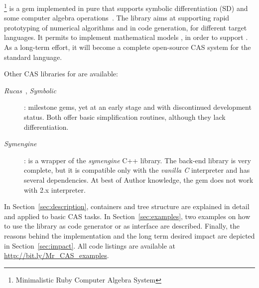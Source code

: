 \ragnicas\footnote{Minimalistic Ruby Computer Algebra System} is a gem implemented in pure \Ruby that supports symbolic differentiation (SD) and some computer algebra operations~\cite{von2013modern}. The library aims at supporting  rapid prototyping of numerical algorithms and in code generation, for different target languages. It permits to implement mathematical models , in order to support . As a long-term effort, it will become a complete open-source CAS system for the standard \Ruby language.

Other CAS libraries for \Ruby are available:
\begin{description}
  \item [\emph{Rucas}~\cite{rucas}, \emph{Symbolic}~\cite{symbolic}]: milestone gems, yet at an early stage and with discontinued development status. Both offer basic simplification routines, although they lack differentiation.
  \item [\emph{Symengine}~\cite{symengine}]: is a wrapper of the \emph{symengine} C++ library. The back-end library is very complete, but it is compatible only with the \emph{vanilla C} \Ruby interpreter and has several dependencies.
  At best of Author knowledge, the gem does not work with \Ruby 2.x interpreter.
\end{description}

In Section~\ref{sec:description}, \ragnicas containers and tree structure are explained in detail and applied to basic CAS tasks. In Section~\ref{sec:examples}, two examples on how to use the library as code generator or as interface are described. Finally, the reasons behind the implementation and the long term desired impact are depicted in Section~\ref{sec:impact}. All code listings are available at \url{http://bit.ly/Mr_CAS_examples}.
